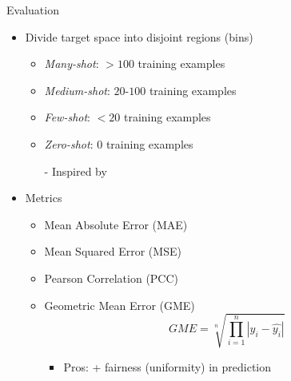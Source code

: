 \begin{frame}{Evaluation}
	\begin{itemize}\setlength\itemsep{1.5em}
		\item Divide target space into disjoint regions (bins)
		\begin{itemize}
			\item \emph{Many-shot}: $>100$ training examples
			\item \emph{Medium-shot}: $20$-$100$ training examples
			\item \emph{Few-shot}: $<20$ training examples
			\item \emph{Zero-shot}: $0$ training examples
			\item[-] Inspired by \cite{liu2019large}
		\end{itemize}
		\item Metrics
		\begin{itemize}
			\item Mean Absolute Error (MAE)
			\item Mean Squared Error (MSE)
			\item Pearson Correlation (PCC)
			\item Geometric Mean Error (GME)
			\begin{equation*}
				GME = \sqrt[n]{\prod_{i=1}^n |y_i - \hat{y_i}|}
			\end{equation*}
			\begin{itemize}
				\item Pros: + fairness (uniformity) in prediction
			\end{itemize}
		\end{itemize}
	\end{itemize}
\end{frame}